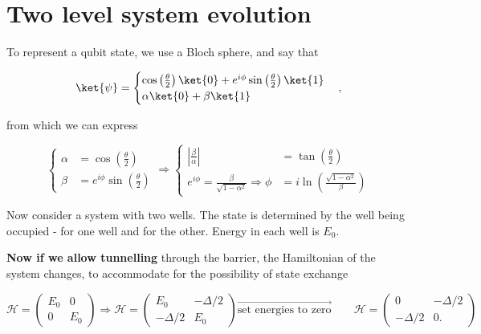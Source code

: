 \section{Two level system evolution\label{sec:firstLecture}}
To represent a qubit state, we use a Bloch sphere, and say that

\begin{equation}
  \label{eqn:bloch}
  \ket{\psi} = \begin{cases}
    \cos\left(\frac{\theta}{2}\right)\ket{0} + e^{i\phi}\sin\left(\frac{\theta}{2}\right)\ket{1}\\
    \alpha\ket{0}+\beta\ket{1}
  \end{cases},
\end{equation}

\noindent from which we can express

   \begin{equation}
     \left\lbrace\begin{aligned}
         \alpha & = \cos\left(\frac{\theta}{2}\right)\\
         \beta & = e^{i\phi}\sin\left(\frac{\theta}{2}\right)
       \end{aligned}\right. \Rightarrow
     \left\lbrace\begin{aligned}
         \left|\frac{\beta}{\alpha}\right| & =\tan\left(\frac{\theta}{2}\right)\\
         e^{i\phi} = \frac{\beta}{\sqrt{1-\alpha^2}}\Rightarrow \phi & = i\ln\left(\frac{\sqrt{1-\alpha^2}}{\beta}\right)
       \end{aligned}\right.
   \end{equation}

   \noindent  Now consider  a  system  with two  wells.   The state  is
   determined by  the well being occupied  -  for one  well and
    for the other. Energy in each well is $E_0$.

   \textbf{Now  if  we  allow  tunnelling}  through  the  barrier,  the
   Hamiltonian  of   the  system   changes,  to  accommodate   for  the
   possibility of state exchange

   \begin{equation}
     \label{l1-decreaseBarrier}
     \mathcal{H} = \begin{pmatrix}
       E_0 & 0 \\ 0 & E_0
     \end{pmatrix}    \Rightarrow   \mathcal{H}    =   \begin{pmatrix}    E_0   &
       -\Delta/2\\-\Delta/2 & E_0
     \end{pmatrix}  \overrightarrow{\text{set  energies   to  zero}}  \qquad
     \mathcal{H} = \begin{pmatrix} 0 & -\Delta/2\\-\Delta/2 & 0.
     \end{pmatrix}
   \end{equation}


